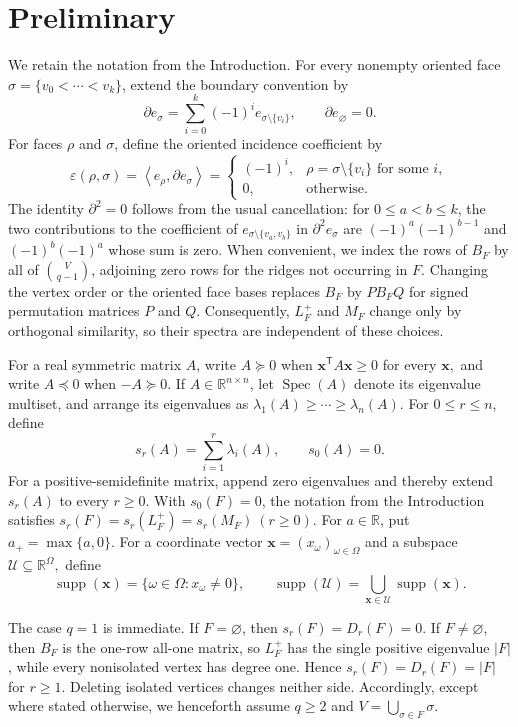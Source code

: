 \documentclass[11pt]{article}
\newcommand{\R}{\mathbb{R}}
\newcommand{\Spec}{\operatorname{Spec}}
\newcommand{\supp}{\operatorname{supp}}
\newcommand{\bd}{\partial}
\newcommand{\ip}[2]{\left\langle #1,#2\right\rangle}
\newcommand{\scrU}{\mathscr{U}}
\begin{document}
	\section{Preliminary}\label{sec:notation}

We retain the notation from the Introduction. For every nonempty
oriented face \(\sigma=\{v_0<\cdots<v_k\}\), extend the boundary
convention by
\[
\bd e_\sigma
=
\sum_{i=0}^k(-1)^i e_{\sigma\setminus\{v_i\}},
\qquad
\bd e_\varnothing=0.
\]
For faces \(\rho\) and \(\sigma\), define the oriented incidence
coefficient by
\[
\varepsilon(\rho,\sigma)
=
\ip{e_\rho}{\bd e_\sigma}
=
\begin{cases}
(-1)^i,
&\rho=\sigma\setminus\{v_i\}\text{ for some }i,\\
0,
&\text{otherwise}.
\end{cases}
\]
The identity \(\bd^2=0\) follows from the usual cancellation: for
\(0\le a<b\le k\), the two contributions to the coefficient of
\(e_{\sigma\setminus\{v_a,v_b\}}\) in \(\bd^2e_\sigma\) are
$(-1)^a(-1)^{b-1}$ and $(-1)^b(-1)^a$
whose sum is zero.
When convenient, we index the rows of \(B_F\) by all of
\(\binom{V}{q-1}\), adjoining zero rows for the ridges not occurring in
\(F\). Changing the vertex order or the oriented face bases replaces
\(B_F\) by \(PB_FQ\) for signed permutation matrices \(P\) and \(Q\).
Consequently, \(L_F^+\) and \(M_F\) change only by orthogonal similarity,
so their spectra are independent of these choices.

For a real symmetric matrix \(A\), write \(A\succeq0\) when $
\mathbf x^{\mathsf T}A\mathbf x\ge0$  for every $\mathbf x,$
and write \(A\preceq0\) when \(-A\succeq0\). If
\(A\in\R^{n\times n}\), let \(\Spec(A)\) denote its eigenvalue multiset,
and arrange its eigenvalues as
$\lambda_1(A)\ge\cdots\ge\lambda_n(A).$
For \(0\le r\le n\), define
\[
s_r(A)=\sum_{i=1}^r\lambda_i(A),
\qquad
s_0(A)=0.
\]
For a positive-semidefinite matrix, append zero eigenvalues and thereby
extend \(s_r(A)\) to every \(r\ge0\). With \(s_0(F)=0\), the notation
from the Introduction satisfies $s_r(F)=s_r(L_F^+)=s_r(M_F)\  (r\ge0).$
For \(a\in\R\), put \(a_+=\max\{a,0\}\). For a coordinate vector
\(\mathbf x=(x_\omega)_{\omega\in\Omega}\) and a subspace
\(\scrU\subseteq\R^\Omega,\)  define
\[
\supp(\mathbf x)=\{\omega\in\Omega:x_\omega\ne0\},
\qquad
\supp(\scrU)=\bigcup_{\mathbf x\in\scrU}\supp(\mathbf x).
\]

The case \(q=1\) is immediate. If \(F=\varnothing\), then
\(s_r(F)=D_r(F)=0\). If \(F\ne\varnothing\), then \(B_F\) is the
one-row all-one matrix, so \(L_F^+\) has the single positive eigenvalue
\(|F|\), while every nonisolated vertex has degree one. Hence
$s_r(F)=D_r(F)=|F|$ for \(r\ge1\).
Deleting isolated vertices changes neither side. Accordingly, except
where stated otherwise, we henceforth assume
$q\ge2$ and $V=\bigcup_{\sigma\in F}\sigma.$
	
\end{document}
